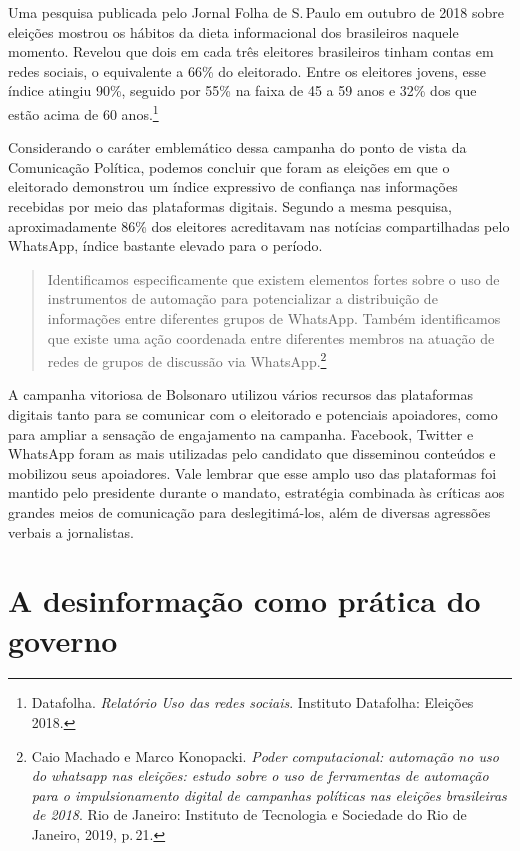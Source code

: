 Uma pesquisa publicada pelo Jornal Folha de S.\,Paulo em outubro de 2018
sobre eleições mostrou os hábitos da dieta informacional dos brasileiros
naquele momento. Revelou que dois em cada três eleitores brasileiros
tinham contas em redes sociais, o equivalente a 66\% do eleitorado.
Entre os eleitores jovens, esse índice atingiu 90\%, seguido por 55\% na
faixa de 45 a 59 anos e 32\% dos que estão acima de 60 anos.\footnote{Datafolha. \textit{Relatório Uso das redes sociais}. Instituto Datafolha: Eleições 2018.}

Considerando o caráter emblemático dessa campanha do ponto de vista da
Comunicação Política, podemos concluir que foram as eleições em que o
eleitorado demonstrou um índice expressivo de confiança nas informações
recebidas por meio das plataformas digitais. Segundo a mesma pesquisa,
aproximadamente 86\% dos eleitores acreditavam nas notícias
compartilhadas pelo WhatsApp, índice bastante elevado para o período.

\begin{quote}
Identificamos especificamente que existem elementos fortes sobre o uso
de instrumentos de automação para potencializar a distribuição de
informações entre diferentes grupos de WhatsApp. Também identificamos
que existe uma ação coordenada entre diferentes membros na atuação de
redes de grupos de discussão via WhatsApp.\footnote{Caio Machado e Marco Konopacki. \textit{Poder computacional: automação
no uso do whatsapp nas eleições: estudo sobre o uso de ferramentas de
automação para o impulsionamento digital de campanhas políticas nas
eleições brasileiras de 2018}. Rio de Janeiro: Instituto de Tecnologia e Sociedade do Rio de Janeiro, 2019, p.\,21.}
\end{quote}

A campanha vitoriosa de Bolsonaro utilizou vários recursos das
plataformas digitais tanto para se comunicar com o eleitorado e potenciais
apoiadores, como para ampliar a sensação de engajamento na campanha.
Facebook, Twitter e WhatsApp foram as mais utilizadas pelo candidato que
disseminou conteúdos e mobilizou seus apoiadores. Vale lembrar que esse
amplo uso das plataformas foi mantido pelo presidente durante o mandato,
estratégia combinada às críticas aos grandes meios de comunicação para
deslegitimá-los, além de diversas agressões verbais a jornalistas.

\section{A desinformação como prática do governo}

